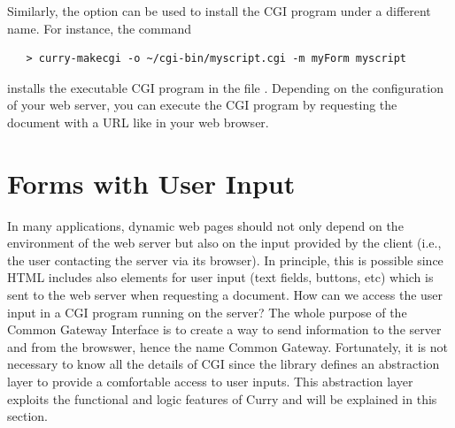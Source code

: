 Similarly, the option  can be used to install the CGI program
under a different name. For instance, the command
%
\begin{verbatim}
   > curry-makecgi -o ~/cgi-bin/myscript.cgi -m myForm myscript
\end{verbatim}
%
installs the executable CGI program
in the file .
Depending on the configuration of your web server,
you can execute the CGI program by requesting the
document with a URL like
in your web browser.


\section{Forms with User Input}
\label{sec-html-forms}

In many applications, dynamic web pages should not only depend
on the environment of the web server but also on the input
provided by the client (i.e., the user contacting the server
via its browser). In principle, this is possible since
HTML includes also elements for user input (text fields, buttons, etc)
which is sent to the web server when requesting a document.
How can we access the user input in a CGI program running on
the server?
The whole purpose of the Common Gateway Interface is
to create a way to send information to the server and from the browswer,
hence the name Common Gateway.
Fortunately, it is not necessary to know all the details of
CGI since the library  defines an abstraction layer
to provide a comfortable access to user inputs.
This abstraction layer exploits the functional and logic features
of Curry and will be explained in this section.

